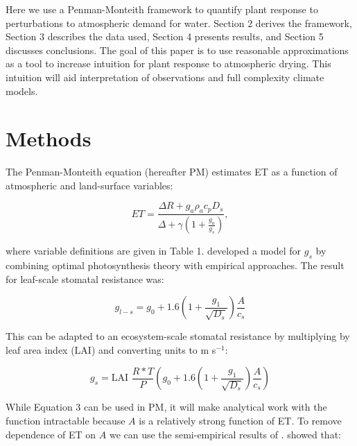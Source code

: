 \documentclass[draft,linenumbers]{agujournal}
\begin{document}
Here we use a Penman-Monteith framework to quantify plant response to perturbations to atmospheric demand for water. Section 2 derives the framework, Section 3 describes the data used, Section 4 presents results, and Section 5 discusses conclusions. The goal of this paper is to use reasonable approximations as a tool to increase intuition for plant response to atmospheric drying. This intuition will aid interpretation of observations and full complexity climate models.

\section{Methods}

The Penman-Monteith equation (hereafter PM) estimates ET as a function of atmospheric and land-surface variables:

\begin{linenomath*}
  \begin{equation}
      ET = \frac{\Delta R + g_a \rho_a c_p D_{s}}{\Delta + \gamma(1 + \frac{g_a}{g_s})},
  \end{equation}
\end{linenomath*}

 where variable definitions are given in Table 1. \citet{MEDLYN_2011} developed a model for $g_s$ by combining optimal photosynthesis theory with empirical approaches. The result for leaf-scale stomatal resistance was:

\begin{linenomath*}
  \begin{equation}
  g_{l-s} = g_0 + 1.6 \left(1 + \frac{g_1}{\sqrt{D_{s}}}\right) \frac{A}{c_s}
  \end{equation}
\end{linenomath*}

This can be adapted to an ecosystem-scale stomatal resistance by multiplying by leaf area index (LAI) and converting units to m s$^{-1}$:
\begin{linenomath*}
  \begin{equation}
  g_s = \text{LAI } \frac{R* T}{P} \left( g_0 + 1.6 \left(1 + \frac{g_1}{\sqrt{D_{s}}}\right) \frac{A}{c_s}\right)
  \end{equation}
\end{linenomath*}

While Equation 3 can be used in PM, it will make analytical work with the function intractable because $A$ is a relatively strong function of ET. To remove dependence of ET on $A$ we can use the semi-empirical results of \citet{Zhou_2015}. \citet{Zhou_2015} showed that:
\end{document}
